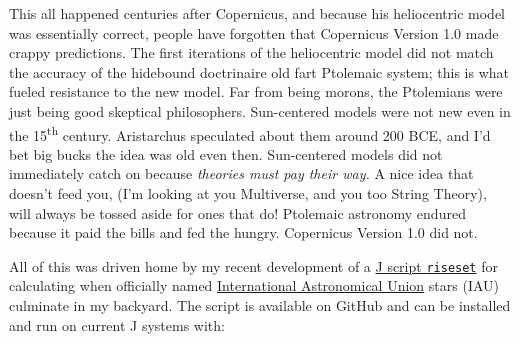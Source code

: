 This all happened centuries after Copernicus, and because his
heliocentric model was essentially correct, people have forgotten that
Copernicus Version 1.0 made crappy predictions. The first iterations of
the heliocentric model did not match the accuracy of the hidebound
doctrinaire old fart Ptolemaic system; this is what fueled resistance
to the new model. Far from being morons, the Ptolemians were just being
good skeptical philosophers. Sun-centered models were not new even in
the 15\textsuperscript{th} century. Aristarchus speculated about them
around 200 BCE, and I'd bet big bucks the idea was old even then.
Sun-centered models did not immediately catch on because \emph{theories must
pay their way.} A nice idea that doesn't feed you, (I'm looking at you
Multiverse, and you too String Theory), will always be tossed aside for
ones that do! Ptolemaic astronomy endured because it paid the bills and
fed the hungry. Copernicus Version 1.0 did not.

All of this was driven home by my recent development of a
\href{https://github.com/bakerjd99/jackshacks/blob/main/riseset.ijs}{J
script \texttt{riseset}} for calculating when officially named
\href{https://www.iau.org/}{International Astronomical Union} stars
(IAU) culminate in my backyard. The script is available on GitHub and
can be installed and run on current J systems with:

\begin{Shaded}
\begin{Highlighting}[]

\end{Highlighting}
\end{Shaded}

